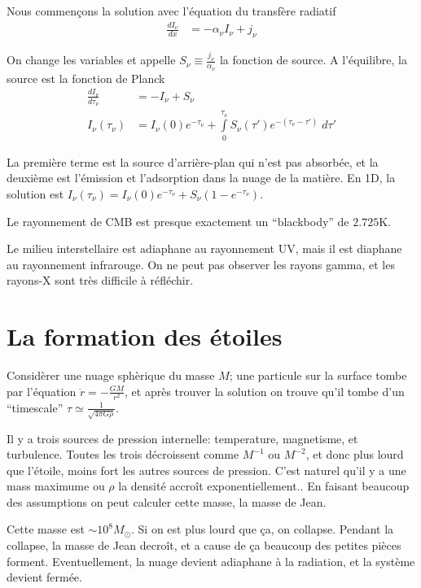 \documentclass[10pt]{report}
\newcommand{\rd}[2]{\frac{d#1}{d#2}}
\begin{document}
Nous commen\c{c}ons la solution avec l'\'equation du transf\`ere radiatif
\begin{align}
    \rd{I_\nu}{x} &= -\alpha_\nu I_\nu + j_\nu
\end{align}

On change les variables et appelle  $S_\nu \equiv \frac{j_\nu}{\alpha_\nu}$ la fonction de source. A l'\'equilibre, la source est la fonction de Planck
\begin{align}
    \rd{I_\nu}{\tau_\nu} &= -I_\nu + S_\nu\\
    I_\nu(\tau_\nu) &= I_\nu(0)e^{-\tau_\nu} + \int\limits_{0}^{\tau_\nu}S_\nu(\tau')e^{-(\tau_\nu -\tau')}\;d\tau'
\end{align}

La premi\`ere terme est la source d'arri\`ere-plan qui n'est pas absorb\'ee, et la deuxi\`eme est l'\'emission et l'adsorption dans la nuage de la mati\`ere. En 1D, la solution est $I_\nu(\tau_\nu) = I_\nu(0) e^{-\tau_\nu} + S_\nu\left( 1 - e^{-\tau_\nu} \right)$.

Le rayonnement de CMB est presque exactement un ``blackbody'' de $2.725$K. 

Le milieu interstellaire est adiaphane au rayonnement UV, mais il est diaphane au rayonnement infrarouge. On ne peut pas observer les rayons gamma, et les rayons-X sont tr\`es difficile \`a r\'efl\'echir.

\section{La formation des \'etoiles}

Consid\`erer une nuage sph\`erique du masse $M$; une particule sur la surface tombe par l'\'equation $\ddot{r} = -\frac{GM}{r^2}$, et apr\`es trouver la solution on trouve qu'il tombe d'un ``timescale'' $\tau \simeq \frac{1}{\sqrt{4\pi G\rho}}$.

Il y a trois sources de pression internelle: temperature, magnetisme, et turbulence. Toutes les trois d\'ecroissent comme $M^{-1}$ ou $M^{-2}$, et donc plus lourd que l'\'etoile, moins fort les autres sources de pression. C'est naturel qu'il y a une mass maximume ou $\rho$ la densit\'e accro\^it exponentiellement.. En faisant beaucoup des assumptions on peut calculer cette masse, la masse de Jean.

Cette masse est $\sim10^{8}M_{\odot}$. Si on est plus lourd que \c{c}a, on collapse. Pendant la collapse, la masse de Jean decro\^it, et a cause de \c{c}a beaucoup des petites pi\`eces forment. Eventuellement, la nuage devient adiaphane \`a la radiation, et la syst\`eme devient ferm\'ee.
\end{document}
